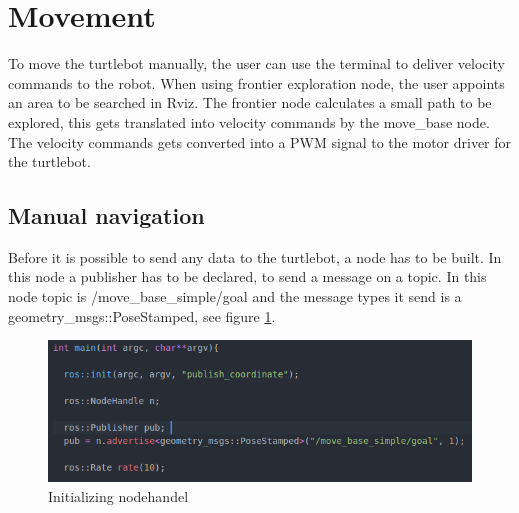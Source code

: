 %
%
%
%

\section{Movement}\label{ch:designMovement}
To move the turtlebot manually, the user can use the terminal to deliver velocity commands to the robot. When using frontier exploration node, the user appoints an area to be searched in Rviz. The frontier node calculates a small path to be explored, this gets translated into velocity commands by the move\_base node. The velocity commands gets converted into a PWM signal to the motor driver for the turtlebot.

\subsection{Manual navigation}
Before it is possible to send any data to the turtlebot, a node has to be built. In this node a publisher has to be declared, to send a message on a topic. In this node topic is /move\_base\_simple/goal and the message types it send is a geometry\_msgs::PoseStamped, see figure \ref{fig:nodehandle}.
\begin{figure}[h]
    \centering
    \includegraphics[width=.8\textwidth]{figures/initByC.png}
    \caption{Initializing nodehandel} 
    \label{fig:nodehandle} 
\end{figure}



